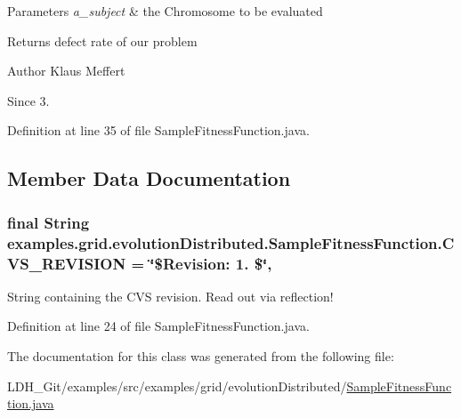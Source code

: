 \begin{DoxyParams}{Parameters}
{\em a\-\_\-subject} & the Chromosome to be evaluated \\
\hline
\end{DoxyParams}
\begin{DoxyReturn}{Returns}
defect rate of our problem
\end{DoxyReturn}
\begin{DoxyAuthor}{Author}
Klaus Meffert 
\end{DoxyAuthor}
\begin{DoxySince}{Since}
3. 
\end{DoxySince}


Definition at line 35 of file Sample\-Fitness\-Function.\-java.



\subsection{Member Data Documentation}
\hypertarget{classexamples_1_1grid_1_1evolution_distributed_1_1_sample_fitness_function_a97918cd34efaeb8842ddef9af907e86a}{
\subsubsection[{C\-V\-S\-\_\-\-R\-E\-V\-I\-S\-I\-O\-N}]{\setlength{\rightskip}{0pt plus 5cm}final String examples.\-grid.\-evolution\-Distributed.\-Sample\-Fitness\-Function.\-C\-V\-S\-\_\-\-R\-E\-V\-I\-S\-I\-O\-N = \char`\"{}\$Revision\-: 1. \$\char`\"{}\hspace{0.3cm}{\ttfamily [static]}, {\ttfamily [private]}}}\label{classexamples_1_1grid_1_1evolution_distributed_1_1_sample_fitness_function_a97918cd34efaeb8842ddef9af907e86a}
String containing the C\-V\-S revision. Read out via reflection! 

Definition at line 24 of file Sample\-Fitness\-Function.\-java.



The documentation for this class was generated from the following file\-:\begin{DoxyCompactItemize}
\item 
L\-D\-H\-\_\-\-Git/examples/src/examples/grid/evolution\-Distributed/\hyperlink{grid_2evolution_distributed_2_sample_fitness_function_8java}{Sample\-Fitness\-Function.\-java}\end{DoxyCompactItemize}
